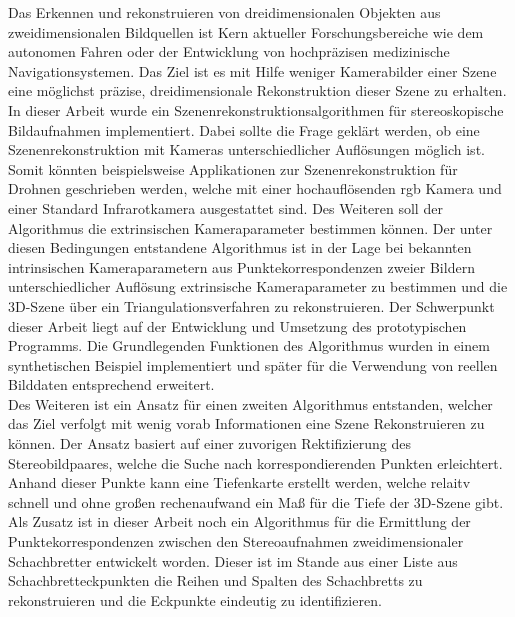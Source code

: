 
Das Erkennen und rekonstruieren von dreidimensionalen Objekten aus zweidimensionalen Bildquellen ist Kern aktueller Forschungsbereiche wie dem autonomen Fahren oder der Entwicklung von hochpräzisen medizinische Navigationsystemen. Das Ziel ist es mit Hilfe weniger Kamerabilder einer Szene eine möglichst präzise, dreidimensionale Rekonstruktion dieser Szene zu erhalten.\\

In dieser Arbeit wurde ein Szenenrekonstruktionsalgorithmen für stereoskopische Bildaufnahmen implementiert. Dabei sollte die Frage geklärt werden, ob eine Szenenrekonstruktion mit Kameras unterschiedlicher Auflösungen möglich ist. Somit könnten beispielsweise Applikationen zur Szenenrekonstruktion für Drohnen geschrieben werden, welche mit einer hochauflösenden rgb Kamera und einer Standard Infrarotkamera ausgestattet sind. Des Weiteren soll der Algorithmus die extrinsischen Kameraparameter bestimmen können. Der unter diesen Bedingungen entstandene Algorithmus ist in der Lage bei bekannten intrinsischen Kameraparametern aus Punktekorrespondenzen zweier Bildern unterschiedlicher Auflösung extrinsische Kameraparameter zu bestimmen und die 3D-Szene über ein Triangulationsverfahren zu rekonstruieren. Der Schwerpunkt dieser Arbeit liegt auf der Entwicklung und Umsetzung des prototypischen Programms. Die Grundlegenden Funktionen des Algorithmus wurden in einem synthetischen Beispiel implementiert und später für die Verwendung von reellen Bilddaten entsprechend erweitert. \\

Des Weiteren ist ein Ansatz für einen zweiten Algorithmus entstanden, welcher das Ziel verfolgt mit wenig vorab Informationen eine Szene Rekonstruieren zu können. Der Ansatz basiert auf einer zuvorigen Rektifizierung des Stereobildpaares, welche die Suche nach korrespondierenden Punkten erleichtert. Anhand dieser Punkte kann eine Tiefenkarte erstellt werden, welche relaitv schnell und ohne großen rechenaufwand ein Maß für die Tiefe der 3D-Szene gibt.\\

Als Zusatz ist in dieser Arbeit noch ein Algorithmus für die Ermittlung der Punktekorrespondenzen zwischen den Stereoaufnahmen zweidimensionaler Schachbretter entwickelt worden. Dieser ist im Stande aus einer Liste aus Schachbretteckpunkten die Reihen und Spalten des Schachbretts zu rekonstruieren und die Eckpunkte eindeutig zu identifizieren.




